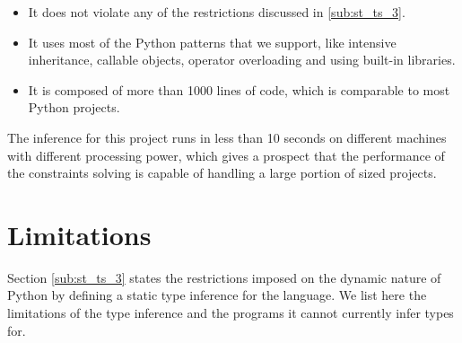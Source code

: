 \begin{itemize}
	\item It does not violate any of the restrictions discussed in \ref{sub:st_ts_3}.
	\item It uses most of the Python patterns that we support, like intensive inheritance, callable objects, operator overloading and using built-in libraries.
	\item It is composed of more than 1000 lines of code, which is comparable to most Python projects.
\end{itemize}
The inference for this project runs in less than 10 seconds on different machines with different processing power, which gives a prospect that the performance of the constraints solving is capable of handling a large portion of sized projects.

\section{Limitations}
Section \ref{sub:st_ts_3} states the restrictions imposed on the dynamic nature of Python by defining a static type inference for the language. We list here the limitations of the type inference and the programs it cannot currently infer types for.

